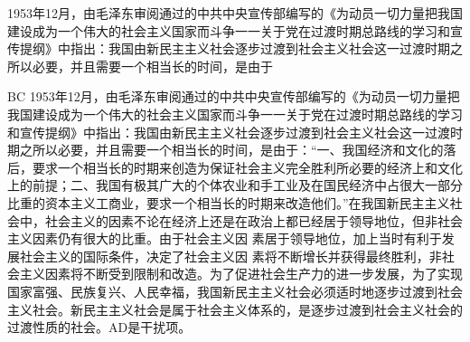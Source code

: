 \question 1953年12月，由毛泽东审阅通过的中共中央宣传部编写的《为动员一切力量把我国建设成为一个伟大的社会主义国家而斗争一一关于党在过渡时期总路线的学习和宣传提纲》中指出：我国由新民主主义社会逐步过渡到社会主义社会这一过渡时期之所以必要，并且需要一个相当长的时间，是由于
\par{}
\begin{solution}BC
1953年12月，由毛泽东审阅通过的中共中央宣传部编写的《为动员一切力量把我国建设成为一个伟大的社会主义国家而斗争一一关于党在过渡时期总路线的学习和宣传提纲》中指出：我国由新民主主义社会逐步过渡到社会主义社会这一过渡时期之所以必要，并且需要一个相当长的时间，是由于：``一、我国经济和文化的落后，要求一个相当长的时期来创造为保证社会主义完全胜利所必要的经济上和文化上的前提；二、我国有极其广大的个体农业和手工业及在国民经济中占很大一部分比重的资本主义工商业，要求一个相当长的时期来改造他们。''在我国新民主主义社会中，社会主义的因素不论在经济上还是在政治上都已经居于领导地位，但非社会主义因素仍有很大的比重。由于社会主义因
素居于领导地位，加上当时有利于发展社会主义的国际条件，决定了社会主义因
素将不断增长并获得最终胜利，非社会主义因素将不断受到限制和改造。为了促进社会生产力的进一步发展，为了实现国家富强、民族复兴、人民幸福，我国新民主主义社会必须适时地逐步过渡到社会主义社会。新民主主义社会是属于社会主义体系的，是逐步过渡到社会主义社会的过渡性质的社会。AD是干扰项。
\end{solution}
